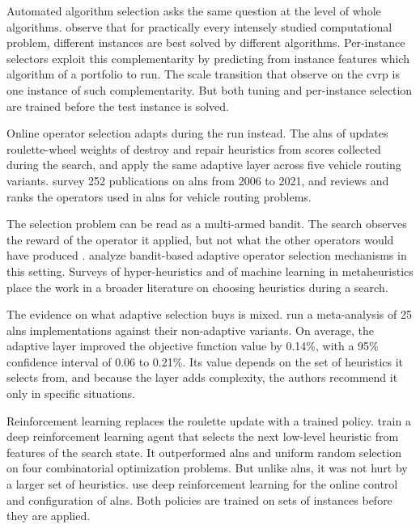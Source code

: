 Automated algorithm selection asks the same question at the level of whole algorithms. \citet{kerschke2019automated} observe that for practically every intensely studied computational problem, different instances are best solved by different algorithms. Per-instance selectors exploit this complementarity by predicting from instance features which algorithm of a portfolio to run. The scale transition that \citet{queirogaXLInstancesCapacitated2026} observe on the \gls{cvrp} is one instance of such complementarity. But both tuning and per-instance selection are trained before the test instance is solved.

Online operator selection adapts during the run instead. The \gls{alns} of \citet{ropkeAdaptiveLargeNeighborhood2006} updates roulette-wheel weights of destroy and repair heuristics from scores collected during the search, and \citet{pisingerGeneralHeuristicVehicle2007} apply the same adaptive layer across five vehicle routing variants. \citet{mara2022survey} survey 252 publications on \gls{alns} from 2006 to 2021, and \citet{voigt2025review} reviews and ranks the operators used in \gls{alns} for vehicle routing problems.

The selection problem can be read as a multi-armed bandit. The search observes the reward of the operator it applied, but not what the other operators would have produced \citep{auerFinitetimeAnalysisMultiarmed2002}. \citet{fialhoAnalyzingBanditbasedAdaptive2010} analyze bandit-based adaptive operator selection mechanisms in this setting. Surveys of hyper-heuristics \citep{burkeHyperheuristicsSurvey2013} and of machine learning in metaheuristics \citep{karimiMamaghanMachineLearning2022} place the work in a broader literature on choosing heuristics during a search.

The evidence on what adaptive selection buys is mixed. \citet{turkes2021meta} run a meta-analysis of 25 \gls{alns} implementations against their non-adaptive variants. On average, the adaptive layer improved the objective function value by 0.14\%, with a 95\% confidence interval of 0.06 to 0.21\%. Its value depends on the set of heuristics it selects from, and because the layer adds complexity, the authors recommend it only in specific situations.

Reinforcement learning replaces the roulette update with a trained policy. \citet{kallestad2023general} train a deep reinforcement learning agent that selects the next low-level heuristic from features of the search state. It outperformed \gls{alns} and uniform random selection on four combinatorial optimization problems. But unlike \gls{alns}, it was not hurt by a larger set of heuristics. \citet{reijnen2024online} use deep reinforcement learning for the online control and configuration of \gls{alns}\@. Both policies are trained on sets of instances before they are applied.

